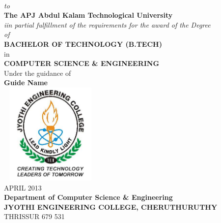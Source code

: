 \begin{titlepage}
	\textbf{\fontsize{16}{32}\selectfont{Student Name 1}} 
	\textbf{\fontsize{12}{28}\selectfont{Register No  }}
	\vspace{0.4cm}\\
	\textit{\fontsize{12}{28}\selectfont to}\\
	\vspace{0.4cm}
	\textbf{\fontsize{14}{28}\selectfont The APJ Abdul Kalam Technological University}\\
	\textit{\fontsize{14}{28}\selectfont iin partial fulfillment of the requirements for the award of the Degree\\of}\\
	\vspace{0.4cm}
	\textbf{\fontsize{16}{32}\selectfont BACHELOR OF TECHNOLOGY (B.TECH)}\\
	\vspace{0.4cm}
	in\\
	\vspace{0.4cm}
	\textbf{\fontsize{14}{28}\selectfont COMPUTER SCIENCE \& ENGINEERING}\\
	\vspace{0.4cm}
	Under the guidance of\\
	\vspace{0.4cm}
	\textbf{Guide Name}\\
	\vspace{0.4cm}
	\includegraphics[height=5cm, width=5cm]{fig/logo1.jpg}\\[0.5cm]
	\vspace{0.4cm}
	{\fontsize{14}{28}\selectfont APRIL 2013}\\[0.5cm]
	\vspace{0.4cm}
	\textbf{\fontsize{14}{28}\selectfont  Department of Computer Science \& Engineering}\\[0.1cm]
		\vspace{0.4cm}
	\textbf{\fontsize{16}{32}\selectfont JYOTHI ENGINEERING COLLEGE, CHERUTHURUTHY}\\[0.1cm]
		\vspace{0.4cm}
	THRISSUR  679 531
\end{titlepage}
\pagebreak
